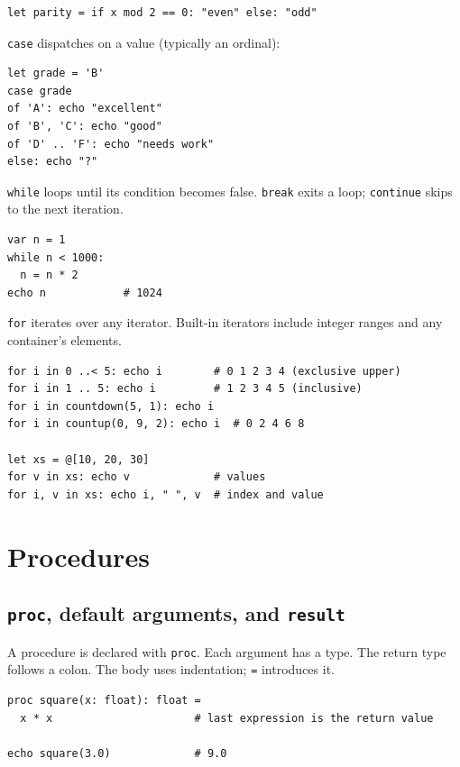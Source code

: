 \documentclass[justified, sixbynine]{tufte-book}
\def\ft{\small\tt}
\theoremstyle{plain}%
\newtheorem * {corollary}{Corollary}
\theoremstyle{definition}
\theoremstyle{remark}
\newtheorem * {remark}{Remark}
\newtheorem * {note}{Note}
\begin{document}
\begin{fullwidth}
\begin{lstlisting}
let parity = if x mod 2 == 0: "even" else: "odd"
\end{lstlisting}

{\ft case} dispatches on a value (typically an ordinal):

\begin{lstlisting}
let grade = 'B'
case grade
of 'A': echo "excellent"
of 'B', 'C': echo "good"
of 'D' .. 'F': echo "needs work"
else: echo "?"
\end{lstlisting}

{\ft while} loops until its condition becomes false. {\ft break} exits a loop; {\ft continue} skips to the next iteration.

\begin{lstlisting}
var n = 1
while n < 1000:
  n = n * 2
echo n            # 1024
\end{lstlisting}

{\ft for} iterates over any iterator. Built-in iterators include integer ranges and any container's elements.

\begin{lstlisting}
for i in 0 ..< 5: echo i        # 0 1 2 3 4 (exclusive upper)
for i in 1 .. 5: echo i         # 1 2 3 4 5 (inclusive)
for i in countdown(5, 1): echo i
for i in countup(0, 9, 2): echo i  # 0 2 4 6 8

let xs = @[10, 20, 30]
for v in xs: echo v             # values
for i, v in xs: echo i, " ", v  # index and value
\end{lstlisting}

\goodbreak\section{Procedures}

\goodbreak\subsection{{\ft proc}, default arguments, and {\ft result}}


A procedure is declared with {\ft proc}. Each argument has a type. The return type follows a colon. The body uses indentation; {\ft =} introduces it.

\begin{lstlisting}
proc square(x: float): float =
  x * x                      # last expression is the return value

echo square(3.0)             # 9.0
\end{lstlisting}


\end{fullwidth}
\end{document}
